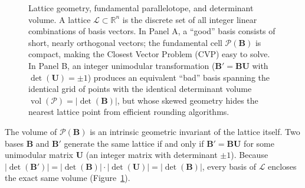 \begin{figure}[H]
\caption{Lattice geometry, fundamental parallelotope, and determinant volume. A lattice $\mathcal{L} \subset \mathbb{R}^n$ is the discrete set of all integer linear combinations of basis vectors. In Panel A, a ``good'' basis consists of short, nearly orthogonal vectors; the fundamental cell $\mathcal{P}(\mathbf{B})$ is compact, making the Closest Vector Problem (CVP) easy to solve. In Panel B, an integer unimodular transformation ($\mathbf{B}' = \mathbf{B}\mathbf{U}$ with $\det(\mathbf{U}) = \pm 1$) produces an equivalent ``bad'' basis spanning the identical grid of points with the identical determinant volume $\operatorname{vol}(\mathcal{P}) = |\det(\mathbf{B})|$, but whose skewed geometry hides the nearest lattice point from efficient rounding algorithms.}
\label{ch41:fig-lattice-geometry}
\end{figure}

The volume of $\mathcal{P}(\mathbf{B})$ is an intrinsic geometric invariant of the lattice
itself. Two bases $\mathbf{B}$ and $\mathbf{B}'$ generate the same lattice if and only
if $\mathbf{B}' = \mathbf{B}\mathbf{U}$ for some unimodular matrix $\mathbf{U}$ (an integer matrix with determinant $\pm 1$). Because $|\det(\mathbf{B}')| = |\det(\mathbf{B})| \cdot |\det(\mathbf{U})| = |\det(\mathbf{B})|$,
every basis of $\mathcal{L}$ encloses the exact same volume (Figure~\ref{ch41:fig-lattice-geometry}).


